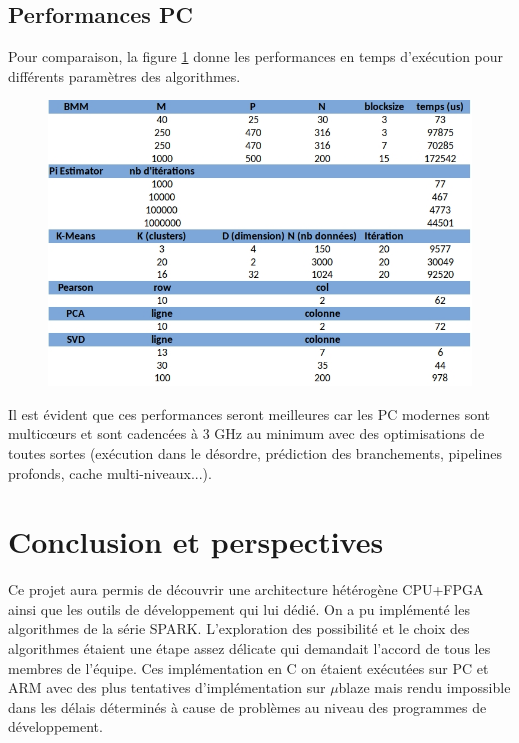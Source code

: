 \documentclass[12pt,a4paper]{article}
\begin{document}
\subsection{Performances PC}
Pour comparaison, la figure \ref{fig:timepc} donne les performances en temps d'exécution pour différents paramètres des algorithmes.
\begin{figure}[H]
	\centering
	\includegraphics[width=0.8\linewidth]{soft/time_pc}
	\caption{}
	\label{fig:timepc}
\end{figure}
Il est évident que ces performances seront meilleures car les PC modernes sont multicœurs et sont cadencées à 3 GHz au minimum avec des optimisations de toutes sortes (exécution dans le désordre, prédiction des branchements, pipelines profonds, cache multi-niveaux...).

\section{Conclusion et perspectives}
Ce projet aura permis de découvrir une architecture hétérogène CPU+FPGA ainsi que les outils de développement qui lui dédié. On a pu implémenté les algorithmes de la série SPARK. L'exploration des possibilité et le choix des algorithmes étaient une étape assez délicate qui demandait l'accord de tous les membres de l'équipe. Ces implémentation en C on étaient exécutées sur PC et ARM avec des plus tentatives d'implémentation sur $\mu$blaze mais rendu impossible dans les délais déterminés à cause de problèmes au niveau des programmes de développement.
\end{document}
